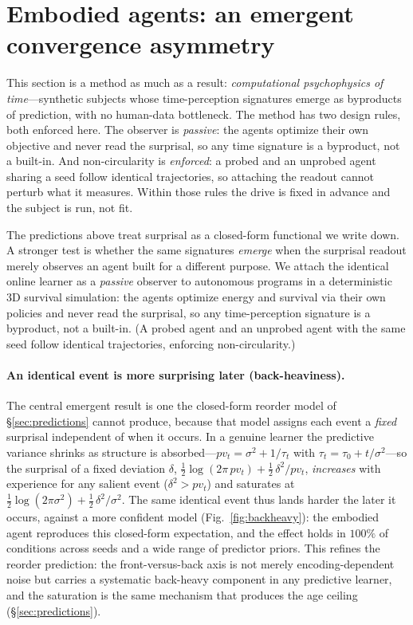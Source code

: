 \documentclass[11pt]{article}
\begin{document}
\section{Embodied agents: an emergent convergence asymmetry}\label{sec:embodied}
This section is a method as much as a result: \emph{computational psychophysics of
time}---synthetic subjects whose time-perception signatures emerge as byproducts of
prediction, with no human-data bottleneck. The method has two design rules, both
enforced here. The observer is \emph{passive}: the agents optimize their own
objective and never read the surprisal, so any time signature is a byproduct, not a
built-in. And non-circularity is \emph{enforced}: a probed and an unprobed agent
sharing a seed follow identical trajectories, so attaching the readout cannot
perturb what it measures. Within those rules the drive is fixed in advance and the
subject is run, not fit.

The predictions above treat surprisal as a closed-form functional we write down.
A stronger test is whether the same signatures \emph{emerge} when the surprisal
readout merely observes an agent built for a different purpose. We attach the
identical online learner as a \emph{passive} observer to autonomous programs in a
deterministic 3D survival simulation: the agents optimize energy and survival via
their own policies and never read the surprisal, so any time-perception signature
is a byproduct, not a built-in. (A probed agent and an unprobed agent with the same
seed follow identical trajectories, enforcing non-circularity.)

\paragraph{An identical event is more surprising later (back-heaviness).}
The central emergent result is one the closed-form reorder model of
\S\ref{sec:predictions} cannot produce, because that model assigns each event a
\emph{fixed} surprisal independent of when it occurs. In a genuine learner the
predictive variance shrinks as structure is absorbed---$pv_t=\sigma^2+1/\tau_t$
with $\tau_t=\tau_0+t/\sigma^2$---so the surprisal of a fixed deviation $\delta$,
$\tfrac12\log(2\pi\,pv_t)+\tfrac12\,\delta^2/pv_t$, \emph{increases} with experience
for any salient event ($\delta^2>pv_t$) and saturates at
$\tfrac12\log(2\pi\sigma^2)+\tfrac12\,\delta^2/\sigma^2$. The same identical event
thus lands harder the later it occurs, against a more confident model
(Fig.~\ref{fig:backheavy}): the embodied agent reproduces this closed-form
expectation, and the effect holds in $100\%$ of conditions across seeds and a wide
range of predictor priors. This refines the reorder prediction: the front-versus-back
axis is not merely encoding-dependent noise but carries a systematic back-heavy
component in any predictive learner, and the saturation is the same mechanism that
produces the age ceiling (\S\ref{sec:predictions}).
\end{document}
